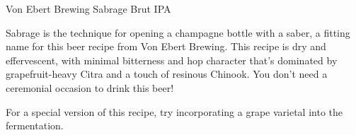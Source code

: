 \begin{recipie}{Von Ebert Brewing Sabrage Brut IPA}

\begin{aboutblock}
Sabrage is the technique for opening a champagne bottle with a saber, a fitting name
for this beer recipe from Von Ebert Brewing. This recipe is dry and effervescent,
with minimal bitterness and hop character that's dominated by grapefruit-heavy Citra
and a touch of resinous Chinook. You don't need a ceremonial occasion to drink
this beer!
\end{aboutblock}


\begin{methodandtiming}
 
\begin{mashsteps}
\end{mashsteps}

\begin{fermentationsteps}
\end{fermentationsteps}

\begin{directions}
For a special version of this recipe, try incorporating a grape varietal into the
fermentation.
\end{directions}

\end{methodandtiming}

\pagebreak

\begin{ingredientsblock}

\begin{malts}
\end{malts}

\begin{hops}
\end{hops}

\begin{yeasts}
\end{yeasts}

\end{ingredientsblock}

\end{recipie}

